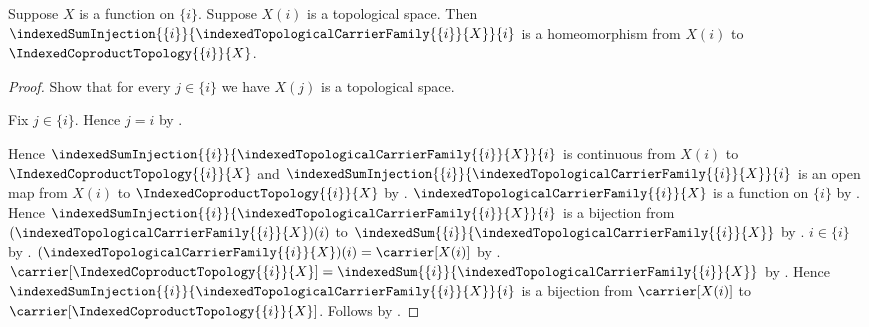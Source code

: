 \begin{theorem}\label{singleton_indexed_coproduct_injection_is_homeomorphism}
    Suppose $X$ is a function on $\{i\}$.
    Suppose $X(i)$ is a topological space.
    Then $\indexedSumInjection{\{i\}}{
        \indexedTopologicalCarrierFamily{\{i\}}{X}}{i}$
        is a homeomorphism from $X(i)$ to
        $\IndexedCoproductTopology{\{i\}}{X}$.
\end{theorem}
\begin{proof}
    Show that for every $j\in\{i\}$ we have $X(j)$ is a topological
        space.
    \begin{subproof}
        Fix $j\in\{i\}$.
        Hence $j=i$ by .
    \end{subproof}
    Hence $\indexedSumInjection{\{i\}}{
        \indexedTopologicalCarrierFamily{\{i\}}{X}}{i}$
        is continuous from $X(i)$ to
            $\IndexedCoproductTopology{\{i\}}{X}$ and
        $\indexedSumInjection{\{i\}}{
            \indexedTopologicalCarrierFamily{\{i\}}{X}}{i}$
        is an open map from $X(i)$ to
            $\IndexedCoproductTopology{\{i\}}{X}$ by
        .
    $\indexedTopologicalCarrierFamily{\{i\}}{X}$ is a function on
        $\{i\}$ by .
    Hence $\indexedSumInjection{\{i\}}{
        \indexedTopologicalCarrierFamily{\{i\}}{X}}{i}$
        is a bijection from
            $(\indexedTopologicalCarrierFamily{\{i\}}{X})(i)$ to
            $\indexedSum{\{i\}}{
                \indexedTopologicalCarrierFamily{\{i\}}{X}}$ by
        .
    $i\in\{i\}$ by .
    $(\indexedTopologicalCarrierFamily{\{i\}}{X})(i)
        =\carrier[X(i)]$ by
        .
    $\carrier[\IndexedCoproductTopology{\{i\}}{X}]
        =\indexedSum{\{i\}}{
            \indexedTopologicalCarrierFamily{\{i\}}{X}}$ by
        .
    Hence $\indexedSumInjection{\{i\}}{
        \indexedTopologicalCarrierFamily{\{i\}}{X}}{i}$
        is a bijection from $\carrier[X(i)]$ to
            $\carrier[\IndexedCoproductTopology{\{i\}}{X}]$.
    Follows by
        .
\end{proof}
